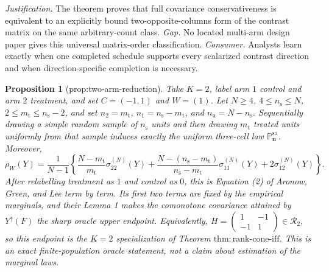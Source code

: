 \documentclass{article}
\newtheorem{proposition}{Proposition}
\begin{document}
\par\smallskip\noindent \textit{Justification.} The theorem proves that full covariance conservativeness is equivalent to an explicitly bound two-opposite-columns form of the contrast matrix on the same arbitrary-count class. \textit{Gap.} No located multi-arm design paper gives this universal matrix-order classification. \textit{Consumer.} Analysts learn exactly when one completed schedule supports every scalarized contrast direction and when direction-specific completion is necessary.

\begin{proposition}[prop:two-arm-reduction]\label{prop:two-arm-reduction}
Take \(K=2\), label arm \(1\) control and arm \(2\) treatment, and set \(C=(-1,1)\) and \(W=(1)\).  Let \(N\geq4\), \(4\leq n_{\mathrm s}\leq N\), \(2\leq m_{\mathrm t}\leq n_{\mathrm s}-2\), and set \(n_2=m_{\mathrm t}\), \(n_1=n_{\mathrm s}-m_{\mathrm t}\), and \(n_{\mathrm u}=N-n_{\mathrm s}\).  Sequentially drawing a simple random sample of \(n_{\mathrm s}\) units and then drawing \(m_{\mathrm t}\) treated units uniformly from that sample induces exactly the uniform three-cell law \(\mathbb P_{\mathbf n}^{\mathrm{sa}}\).  Moreover,
\[
\rho_W(Y)=\frac1{N-1}\left\{
\frac{N-m_{\mathrm t}}{m_{\mathrm t}}\sigma_{22}^{(N)}(Y)
+\frac{N-(n_{\mathrm s}-m_{\mathrm t})}{n_{\mathrm s}-m_{\mathrm t}}\sigma_{11}^{(N)}(Y)
+2\sigma_{12}^{(N)}(Y)\right\}. 
\]
After relabelling treatment as \(1\) and control as \(0\), this is Equation (2) of Aronow, Green, and Lee term by term.  Its first two terms are fixed by the empirical marginals, and their Lemma 1 makes the comonotone covariance attained by \(Y^{\uparrow}(F)\) the sharp oracle upper endpoint.  Equivalently, \(H=\left(\begin{smallmatrix}1&-1\\-1&1\end{smallmatrix}\right)\in\mathcal R_2\), so this endpoint is the \(K=2\) specialization of Theorem \(\mathrm{thm{:}rank\text{-}cone\text{-}iff}\).  This is an exact finite-population oracle statement, not a claim about estimation of the marginal laws.
\end{proposition}
\end{document}
